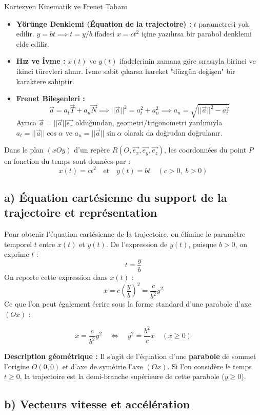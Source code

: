 \documentclass[11pt,a4paper]{article}
\begin{document}
\begin{theoriebox}{Kartezyen Kinematik ve Frenet Tabanı}
\begin{itemize}
    \item \textbf{Yörünge Denklemi (Équation de la trajectoire) :} $t$ parametresi yok edilir. $y = bt \implies t = y/b$ ifadesi $x = ct^2$ içine yazılırsa bir parabol denklemi elde edilir.
    \item \textbf{Hız ve İvme :} $x(t)$ ve $y(t)$ ifadelerinin zamana göre sırasıyla birinci ve ikinci türevleri alınır. İvme sabit çıkarsa hareket "düzgün değişen" bir karaktere sahiptir.
    \item \textbf{Frenet Bileşenleri :}
    $$ \vec{a} = a_t \vec{T} + a_n \vec{N} \implies ||\vec{a}||^2 = a_t^2 + a_n^2 \implies a_n = \sqrt{||\vec{a}||^2 - a_t^2} $$
    Ayrıca $\vec{a} = ||\vec{a}||\vec{e_x}$ olduğundan, geometri/trigonometri yardımıyla $a_t = ||\vec{a}||\cos\alpha$ ve $a_n = ||\vec{a}||\sin\alpha$ olarak da doğrudan doğrulanır.
\end{itemize}
\end{theoriebox}

Dans le plan $(xOy)$ d'un repère $R(O, \vec{e_x}, \vec{e_y}, \vec{e_z})$, les coordonnées du point $P$ en fonction du temps sont données par :
$$ x(t) = c t^2 \quad \text{et} \quad y(t) = b t \quad (c > 0, \; b > 0) $$

\subsection*{a) Équation cartésienne du support de la trajectoire et représentation}
Pour obtenir l'équation cartésienne de la trajectoire, on élimine le paramètre temporel $t$ entre $x(t)$ et $y(t)$.
De l'expression de $y(t)$, puisque $b > 0$, on exprime $t$ :
$$ t = \frac{y}{b} $$
On reporte cette expression dans $x(t)$ :
$$ x = c \left(\frac{y}{b}\right)^2 = \frac{c}{b^2} y^2 $$
Ce que l'on peut également écrire sous la forme standard d'une parabole d'axe $(Ox)$ :
\begin{sonucbox}
$$ x = \frac{c}{b^2} y^2 \quad \Longleftrightarrow \quad y^2 = \frac{b^2}{c} x \quad (x \ge 0) $$
\end{sonucbox}
\textbf{Description géométrique :} Il s'agit de l'équation d'une \textbf{parabole} de sommet l'origine $O(0,0)$ et d'axe de symétrie l'axe $(Ox)$. Si l'on considère le temps $t \ge 0$, la trajectoire est la demi-branche supérieure de cette parabole ($y \ge 0$).

\subsection*{b) Vecteurs vitesse et accélération}
\end{document}
